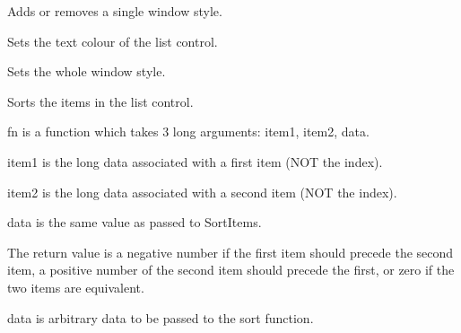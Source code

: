 \label{wxlistctrlsetsinglestyle}


Adds or removes a single window style.

\label{wxlistctrlsettextcolour}


Sets the text colour of the list control.

\label{wxlistctrlsetwindowstyleflag}


Sets the whole window style.

\label{wxlistctrlsortitems}


Sorts the items in the list control.

fn is a function which takes 3 long arguments: item1, item2, data.

item1 is the long data associated with a first item (NOT the index).

item2 is the long data associated with a second item (NOT the index).

data is the same value as passed to SortItems.

The return value is a negative number if the first item should precede the second
item, a positive number of the second item should precede the first,
or zero if the two items are equivalent.

data is arbitrary data to be passed to the sort function.

